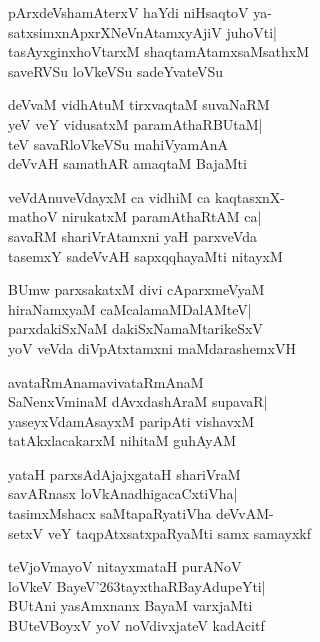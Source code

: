 \documentclass[twoside,12pt,openright]{book}
\def\S{\char'263}
\newcounter{shloka}[chapter]
\begin{document}
\begin{shloka}%
pArxdeVshamAterxV haYdi niHsaqtoV ya-\\
satxsimxnApxrXNeVnAtamxyAjiV juhoVti|\\
tasAyxginxhoVtarxM shaqtamAtamxsaMsathxM\\
saveRVSu loVkeVSu sadeYvateVSu
\end{shloka}

\begin{shloka}%
deVvaM vidhAtuM tirxvaqtaM suvaNaRM\\
yeV veY vidusatxM paramAthaRBUtaM|\\
teV savaRloVkeVSu mahiVyamAnA\\
deVvAH samathAR amaqtaM BajaMti
\end{shloka}

\begin{shloka}%
veVdAnuveVdayxM ca vidhiM ca kaqtasxnX-\\
mathoV nirukatxM paramAthaRtAM ca|\\
savaRM shariVrAtamxni yaH parxveVda\\
tasemxY sadeVvAH sapxqqhayaMti nitayxM
\end{shloka}

\begin{shloka}%
BUmw parxsakatxM divi cAparxmeVyaM\\
hiraNamxyaM caMcalamaMDalAMteV|\\
parxdakiSxNaM dakiSxNamaMtarikeSxV\\
yoV veVda diVpAtxtamxni maMdarashemxVH
\end{shloka}

\begin{shloka}%
avataRmAnamavivataRmAnaM \\
SaNenxVminaM dAvxdashAraM supavaR|\\
yaseyxVdamAsayxM paripAti vishavxM\\
tatAkxlacakarxM nihitaM guhAyAM
\end{shloka}

\begin{shloka}%
yataH parxsAdAjajxgataH shariVraM\\
savARnasx loVkAnadhigacaCxtiVha|\\
tasimxMshacx saMtapaRyatiVha deVvAM-\\
setxV veY taqpAtxsatxpaRyaMti samx samayxkf
\end{shloka}

\begin{shloka}%
teVjoVmayoV nitayxmataH purANoV\\
loVkeV BayeV\S tayxthaRBayAdupeYti|\\
BUtAni yasAmxnanx BayaM varxjaMti\\
BUteVBoyxV yoV noVdivxjateV kadAcitf
\end{shloka}
\end{document}

